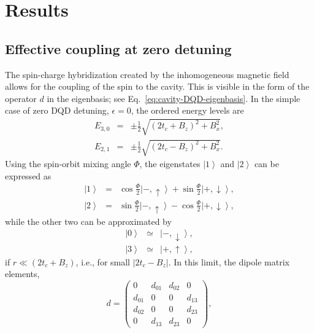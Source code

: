 \documentclass[twocolumn,english,aps,prl,preprint,reprint,showpacs,longbibliography,showkeys]{revtex4-1}
\begin{document}
\section{Results}
\label{sec:Results}

\subsection{Effective coupling at zero detuning}
\label{subsec:coupling-eps0}

The spin-charge hybridization created by the inhomogeneous magnetic field
allows for the coupling of the spin to the cavity. This is visible in the form of the operator $d$ in the eigenbasis; see Eq.~\eqref{eq:cavity-DQD-eigenbasis}.
In the simple case of zero DQD detuning, $\epsilon=0$, the ordered energy levels are
\begin{eqnarray}
E_{3,0} & =&\pm\frac{1}{2}\sqrt{(2t_c+B_z)^2+B_x^2} ,\\
E_{2,1} & =&\pm\frac{1}{2}\sqrt{(2t_c-B_z)^2+B_x^2} . \label{eq:energies}
\end{eqnarray} 
Using the spin-orbit mixing angle $\Phi$, the eigenstates $\left|1\right\rangle$ and $\left|2\right\rangle$ can be expressed as
\begin{eqnarray}
\left|1\right\rangle&= & \cos{\frac{\Phi}{2}}\left|-,\uparrow\right\rangle+\sin{\frac{\Phi}{2}}\left|+,\downarrow\right\rangle, \label{eq:vectors1}\\
\left|2\right\rangle&= & \sin{\frac{\Phi}{2}}\left|-,\uparrow\right\rangle-\cos{\frac{\Phi}{2}}\left|+,\downarrow\right\rangle, \label{eq:vectors2}
\end{eqnarray}
while the other two can be approximated by 
\begin{eqnarray}
\left|0\right\rangle&\simeq & \left|-,\downarrow\right\rangle, \label{eq:vectors3}\\
\left|3\right\rangle&\simeq & \left|+,\uparrow\right\rangle, \label{eq:vectors4}
\end{eqnarray}
if $r\ll (2t_c+B_z)$, i.e., for small $|2t_c-B_z|$.
In this limit, the dipole matrix elements,
\begin{equation}
d=\begin{pmatrix}
0 & d_{01} & d_{02} & 0 \\
d_{01} & 0 & 0 & d_{13}  \\
d_{02} & 0 & 0 & d_{23} \\
0 & d_{13} & d_{23}& 0
\end{pmatrix}
,\label{eq:dmatrix}
\end{equation}
\end{document}
